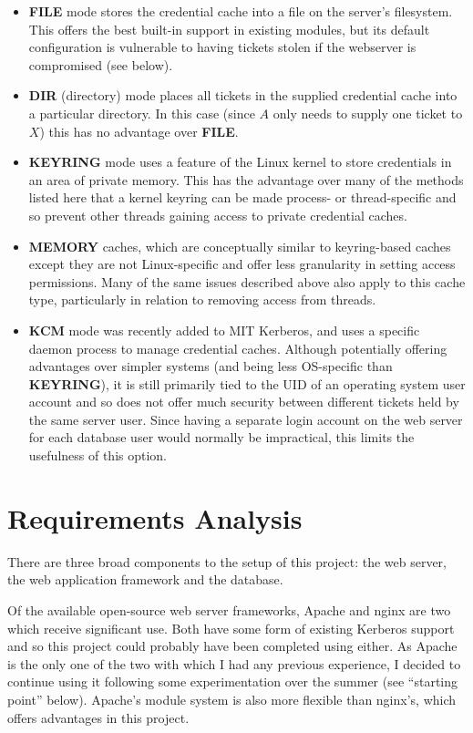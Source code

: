 \documentclass{report}
\begin{document}
\begin{itemize}
\item
  \textbf{FILE} mode stores the credential cache into a file on the server's filesystem. This offers the best built-in support in existing modules, but its default configuration is vulnerable to having tickets stolen if the webserver is compromised (see below).
\item
  \textbf{DIR} (directory) mode places all tickets in the supplied credential cache into a particular directory. In this case (since $A$ only needs to supply one ticket to $X$) this has no advantage over \textbf{FILE}.
\item
  \textbf{KEYRING} mode uses a feature of the Linux kernel to store credentials in an area of private memory. This has the advantage over many of the methods listed here that a kernel keyring can be made process- or thread-specific and so prevent other threads gaining access to private credential caches.

\item
  \textbf{MEMORY} caches, which are conceptually similar to keyring-based caches except they are not Linux-specific and offer less granularity in setting access permissions. Many of the same issues described above also apply to this cache type, particularly in relation to removing access from threads.
\item
  \textbf{KCM} mode was recently added to MIT Kerberos, and uses a specific daemon process to manage credential caches. Although potentially offering advantages over simpler systems (and being less OS-specific than \textbf{KEYRING}), it is still primarily tied to the UID of an operating system user account and so does not offer much security between different tickets held by the same server user. Since having a separate login account on the web server for each database user would normally be impractical, this limits the usefulness of this option.
\end{itemize}

\section{Requirements Analysis}
There are three broad components to the setup of this project: the web server, the web application framework and the database.

Of the available open-source web server frameworks, Apache and nginx are two which receive significant use. Both have some form of existing Kerberos support and so this project could probably have been completed using either. As Apache is the only one of the two with which I had any previous experience, I decided to continue using it following some experimentation over the summer (see ``starting point'' below). Apache's module system is also more flexible than nginx's, which offers advantages in this project.
\end{document}
